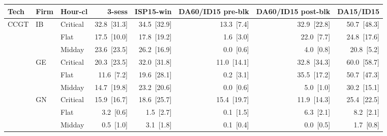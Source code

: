 \begin{tabular}{l l l r r r r r}
\toprule
Tech & Firm & Hour-cl & 3-sess & ISP15-win & DA60/ID15 pre-blk & DA60/ID15 post-blk & DA15/ID15 \\
\midrule
CCGT & IB & Critical & 32.8~{\color{seasoncol}\scriptsize[31.3]} & 34.5~{\color{seasoncol}\scriptsize[32.9]} & 13.3~{\color{seasoncol}\scriptsize[7.4]} & 32.9~{\color{seasoncol}\scriptsize[22.8]} & 50.7~{\color{seasoncol}\scriptsize[48.3]} \\
 &  & Flat & 17.5~{\color{seasoncol}\scriptsize[10.0]} & 17.8~{\color{seasoncol}\scriptsize[19.2]} & 1.6~{\color{seasoncol}\scriptsize[3.0]} & 22.0~{\color{seasoncol}\scriptsize[7.7]} & 24.8~{\color{seasoncol}\scriptsize[17.6]} \\
 &  & Midday & 23.6~{\color{seasoncol}\scriptsize[23.5]} & 26.2~{\color{seasoncol}\scriptsize[16.9]} & 0.0~{\color{seasoncol}\scriptsize[0.6]} & 4.0~{\color{seasoncol}\scriptsize[0.8]} & 20.8~{\color{seasoncol}\scriptsize[5.2]} \\
 & GE & Critical & 20.3~{\color{seasoncol}\scriptsize[23.5]} & 32.0~{\color{seasoncol}\scriptsize[31.8]} & 11.0~{\color{seasoncol}\scriptsize[14.1]} & 32.8~{\color{seasoncol}\scriptsize[34.3]} & 60.0~{\color{seasoncol}\scriptsize[58.7]} \\
 &  & Flat & 11.6~{\color{seasoncol}\scriptsize[7.2]} & 19.6~{\color{seasoncol}\scriptsize[28.1]} & 0.2~{\color{seasoncol}\scriptsize[3.1]} & 35.5~{\color{seasoncol}\scriptsize[17.2]} & 50.7~{\color{seasoncol}\scriptsize[47.3]} \\
 &  & Midday & 14.7~{\color{seasoncol}\scriptsize[19.8]} & 23.2~{\color{seasoncol}\scriptsize[20.6]} & 0.0~{\color{seasoncol}\scriptsize[0.6]} & 5.0~{\color{seasoncol}\scriptsize[1.0]} & 30.2~{\color{seasoncol}\scriptsize[15.1]} \\
 & GN & Critical & 15.9~{\color{seasoncol}\scriptsize[16.7]} & 18.6~{\color{seasoncol}\scriptsize[25.7]} & 15.4~{\color{seasoncol}\scriptsize[19.7]} & 11.9~{\color{seasoncol}\scriptsize[14.3]} & 25.4~{\color{seasoncol}\scriptsize[22.5]} \\
 &  & Flat & 3.2~{\color{seasoncol}\scriptsize[0.6]} & 1.5~{\color{seasoncol}\scriptsize[2.7]} & 0.1~{\color{seasoncol}\scriptsize[1.5]} & 6.3~{\color{seasoncol}\scriptsize[2.1]} & 8.2~{\color{seasoncol}\scriptsize[2.1]} \\
 &  & Midday & 0.5~{\color{seasoncol}\scriptsize[1.0]} & 3.1~{\color{seasoncol}\scriptsize[1.8]} & 0.1~{\color{seasoncol}\scriptsize[0.4]} & 0.0~{\color{seasoncol}\scriptsize[0.5]} & 1.7~{\color{seasoncol}\scriptsize[0.8]} \\

\end{tabular}
